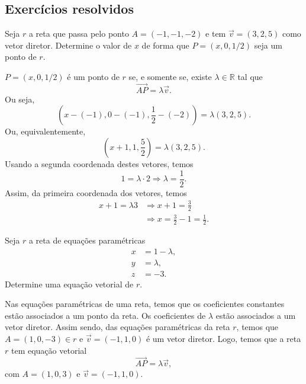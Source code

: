 \subsection{Exercícios resolvidos}

\begin{exeresol}
  Seja $r$ a reta que passa pelo ponto $A = (-1,-1,-2)$ e tem $\vec{v} = (3,2,5)$ como vetor diretor. Determine o valor de $x$ de forma que $P = (x,0,1/2)$ seja um ponto de $r$.
\end{exeresol}
\begin{resol}
  $P = (x,0,1/2)$ é um ponto de $r$ se, e somente se, existe $\lambda\in\mathbb{R}$ tal que
  \begin{equation}
    \overrightarrow{AP} = \lambda\vec{v}.
  \end{equation}
  Ou seja,
  \begin{equation}
    \left(x-(-1),0-(-1),\frac{1}{2}-(-2)\right) = \lambda (3,2,5).
  \end{equation}
  Ou, equivalentemente,
  \begin{equation}
    \left(x+1,1,\frac{5}{2}\right) = \lambda (3,2,5).
  \end{equation}
  Usando a segunda coordenada destes vetores, temos
  \begin{equation}
    1 = \lambda\cdot 2 \Rightarrow \lambda = \frac{1}{2}.
  \end{equation}
  Assim, da primeira coordenada dos vetores, temos
  \begin{align}
    x+1 = \lambda 3 &\Rightarrow x+1 = \frac{3}{2}\\
                    &\Rightarrow x = \frac{3}{2}-1 = \frac{1}{2}.
  \end{align}
\end{resol}

\begin{exeresol}
  Seja $r$ a reta de equações paramétricas
  \begin{align}
    x &= 1 -\lambda,\\
    y &= \lambda,\\
    z &= -3.
  \end{align}
  Determine uma equação vetorial de $r$.
\end{exeresol}
\begin{resol}
  Nas equações paramétricas de uma reta, temos que os coeficientes constantes estão associados a um ponto da reta. Os coeficientes de $\lambda$ estão associados a um vetor diretor. Assim sendo, das equações paramétricas da reta $r$, temos que $A = (1,0,-3)\in r$ e $\vec{v} = (-1,1,0)$ é um vetor diretor. Logo, temos que a reta $r$ tem equação vetorial
  \begin{equation}
    \overrightarrow{AP} = \lambda\vec{v},
  \end{equation}
  com $A = (1,0,3)$ e $\vec{v} = (-1,1,0)$.
\end{resol}

